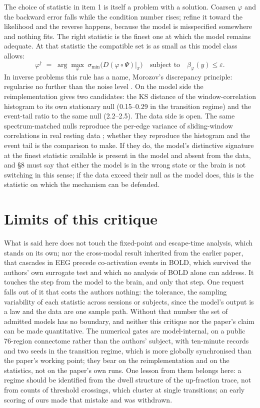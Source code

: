 \documentclass[11pt]{article}
\begin{document}
The choice of statistic in item 1 is itself a problem with a solution. Coarsen $\varphi$ and the backward error falls while the condition number rises; refine it toward the likelihood and the reverse happens, because the model is misspecified somewhere and nothing fits. The right statistic is the finest one at which the model remains adequate. At that statistic the compatible set is as small as this model class allows:
\begin{equation}
\varphi^{\dagger}\;=\;\arg\max_{\varphi}\ \sigma_{\min}\!\bigl(D(\varphi\circ\Psi)\big|_{\pi}\bigr)
\quad\text{subject to}\quad \beta_{\varphi}(y)\le\varepsilon .
\label{eq:design}
\end{equation}
In inverse problems this rule has a name, Morozov's discrepancy principle: regularise no further than the noise level \parencite{engl1996}. On the model side the reimplementation gives two candidates: the KS distance of the window-correlation histogram to its own stationary null (0.15--0.29 in the transition regime) and the event-tail ratio to the same null (2.2--2.5). The data side is open. The same spectrum-matched nulls reproduce the per-edge variance of sliding-window correlations in real resting data \parencite{liegeois2017}; whether they reproduce the histogram and the event tail is the comparison to make. If they do, the model's distinctive signature at the finest statistic available is present in the model and absent from the data, and \S8 must say that either the model is in the wrong state or the brain is not switching in this sense; if the data exceed their null as the model does, this is the statistic on which the mechanism can be defended.

\section{Limits of this critique}
What is said here does not touch the fixed-point and escape-time analysis, which stands on its own; nor the cross-modal result inherited from the earlier paper, that cascades in EEG precede co-activation events in BOLD, which survived the authors' own surrogate test \parencite{rabuffo2021} and which no analysis of BOLD alone can address. It touches the step from the model to the brain, and only that step. One request falls out of it that costs the authors nothing: the tolerance, the sampling variability of each statistic across sessions or subjects, since the model's output is a law and the data are one sample path. Without that number the set of admitted models has no boundary, and neither this critique nor the paper's claim can be made quantitative. The numerical gates are model-internal, on a public 76-region connectome rather than the authors' subject, with ten-minute records and two seeds in the transition regime, which is more globally synchronised than the paper's working point; they bear on the reimplementation and on the statistics, not on the paper's own runs. One lesson from them belongs here: a regime should be identified from the dwell structure of the up-fraction trace, not from counts of threshold crossings, which cluster at single transitions; an early scoring of ours made that mistake and was withdrawn.
\end{document}
